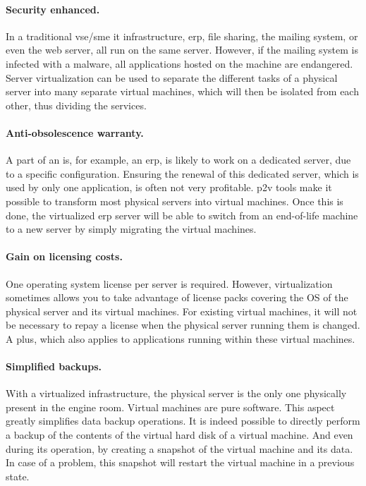 \paragraph{Security enhanced.} In a traditional \acrshort{vse}/\acrshort{sme} \acrshort{it} infrastructure, \acrshort{erp}, file sharing, the mailing system, or even the web server, all run on the same server. However, if the mailing system is infected with a malware, all applications hosted on the machine are endangered. Server virtualization can be used to separate the different tasks of a physical server into many separate virtual machines, which will then be isolated from each other, thus dividing the services.

\paragraph{Anti-obsolescence warranty.} A part of an \acrshort{is}, for example, an \acrshort{erp}, is likely to work on a dedicated server, due to a specific configuration. Ensuring the renewal of this dedicated server, which is used by only one application, is often not very profitable. \acrshort{p2v} tools make it possible to transform most physical servers into virtual machines. Once this is done, the virtualized \acrshort{erp} server will be able to switch from an end-of-life machine to a new server by simply migrating the virtual machines.

\paragraph{Gain on licensing costs.} One operating system license per server is required. However, virtualization sometimes allows you to take advantage of license packs covering the OS of the physical server and its virtual machines. For existing virtual machines, it will not be necessary to repay a license when the physical server running them is changed. A plus, which also applies to applications running within these virtual machines.

\paragraph{Simplified backups.} With a virtualized infrastructure, the physical server is the only one physically present in the engine room. Virtual machines are pure software. This aspect greatly simplifies data backup operations. It is indeed possible to directly perform a backup of the contents of the virtual hard disk of a virtual machine. And even during its operation, by creating a snapshot of the virtual machine and its data. In case of a problem, this snapshot will restart the virtual machine in a previous state.


